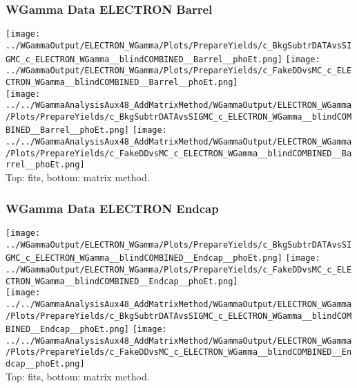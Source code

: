 \documentclass{beamer}
\begin{document}
\begin{frame}\frametitle{WGamma Data ELECTRON Barrel}
  \texttt{[image: ../WGammaOutput/ELECTRON\_WGamma/Plots/PrepareYields/c\_BkgSubtrDATAvsSIGMC\_c\_ELECTRON\_WGamma\_\_blindCOMBINED\_\_Barrel\_\_phoEt.png]} \texttt{[image: ../WGammaOutput/ELECTRON\_WGamma/Plots/PrepareYields/c\_FakeDDvsMC\_c\_ELECTRON\_WGamma\_\_blindCOMBINED\_\_Barrel\_\_phoEt.png]}\\
  \texttt{[image: ../../WGammaAnalysisAux48\_AddMatrixMethod/WGammaOutput/ELECTRON\_WGamma/Plots/PrepareYields/c\_BkgSubtrDATAvsSIGMC\_c\_ELECTRON\_WGamma\_\_blindCOMBINED\_\_Barrel\_\_phoEt.png]} \texttt{[image: ../../WGammaAnalysisAux48\_AddMatrixMethod/WGammaOutput/ELECTRON\_WGamma/Plots/PrepareYields/c\_FakeDDvsMC\_c\_ELECTRON\_WGamma\_\_blindCOMBINED\_\_Barrel\_\_phoEt.png]}\\
  \scriptsize Top: fits, bottom: matrix method.
\end{frame}

\begin{frame}\frametitle{WGamma Data ELECTRON Endcap}
  \texttt{[image: ../WGammaOutput/ELECTRON\_WGamma/Plots/PrepareYields/c\_BkgSubtrDATAvsSIGMC\_c\_ELECTRON\_WGamma\_\_blindCOMBINED\_\_Endcap\_\_phoEt.png]} \texttt{[image: ../WGammaOutput/ELECTRON\_WGamma/Plots/PrepareYields/c\_FakeDDvsMC\_c\_ELECTRON\_WGamma\_\_blindCOMBINED\_\_Endcap\_\_phoEt.png]}\\
  \texttt{[image: ../../WGammaAnalysisAux48\_AddMatrixMethod/WGammaOutput/ELECTRON\_WGamma/Plots/PrepareYields/c\_BkgSubtrDATAvsSIGMC\_c\_ELECTRON\_WGamma\_\_blindCOMBINED\_\_Endcap\_\_phoEt.png]} \texttt{[image: ../../WGammaAnalysisAux48\_AddMatrixMethod/WGammaOutput/ELECTRON\_WGamma/Plots/PrepareYields/c\_FakeDDvsMC\_c\_ELECTRON\_WGamma\_\_blindCOMBINED\_\_Endcap\_\_phoEt.png]}\\
  \scriptsize Top: fits, bottom: matrix method.
\end{frame}
\end{document}
